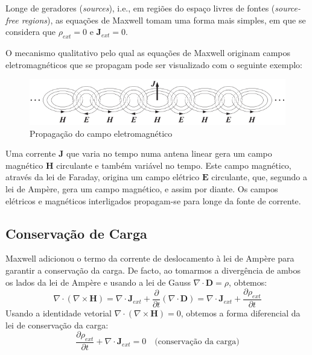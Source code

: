 Longe de geradores (\textit{sources}), i.e., em regiões do espaço livres de fontes (\textit{source-free regions}), as equações de Maxwell tomam uma forma mais simples, em que se considera que $\rho_{ext} = 0$ e $\mathbf{J}_{ext} = 0$.


O mecanismo qualitativo pelo qual as equações de Maxwell originam campos eletromagnéticos que se propagam pode ser visualizado com o seguinte exemplo:

\begin{figure}[H]
    \centering
    \includegraphics[width=0.7\linewidth]{img/1/Propagacao-de-ondas.pdf}
    \caption{Propagação do campo eletromagnético~\cite{orfanidis2008electromagnetic}}
\end{figure}

\begin{check}
    Uma corrente $\mathbf{J}$ que varia no tempo numa antena linear gera um campo magnético $\mathbf{H}$ circulante e também variável no tempo. Este campo magnético, através da lei de Faraday, origina um campo elétrico $\mathbf{E}$ circulante, que, segundo a lei de Ampère, gera um campo magnético, e assim por diante. Os campos elétricos e magnéticos interligados propagam-se para longe da fonte de corrente.
\end{check}

\subsection{Conservação de Carga}

Maxwell adicionou o termo da corrente de deslocamento à lei de Ampère para garantir a conservação da carga. De facto, ao tomarmos a divergência de ambos os lados da lei de Ampère e usando a lei de Gauss $\nabla \cdot \mathbf{D} = \rho$, obtemos:
$$ 
    \nabla \cdot (\nabla \times \mathbf{H}) = \nabla \cdot \mathbf{J}_{ext} + \frac{\partial}{\partial t}(\nabla \cdot \mathbf{D}) = \nabla \cdot \mathbf{J}_{ext} + \frac{\partial \rho_{ext}}{\partial t} 
$$
Usando a identidade vetorial $\nabla \cdot (\nabla \times \mathbf{H}) = 0$, obtemos a forma diferencial da lei de conservação da carga:
$$ 
    \boxed{\frac{\partial \rho_{ext}}{\partial t} + \nabla \cdot \mathbf{J}_{ext} = 0} \quad \text{(conservação da carga)} 
$$

